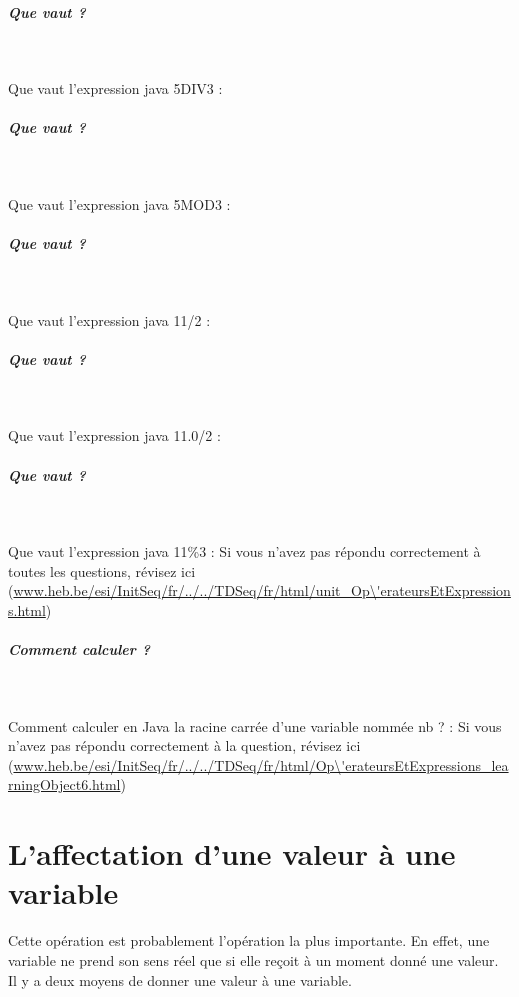 \documentclass[11pt,a4paper]{article}
\begin{document}
			
		\subparagraph{Que vaut ?} 
		
                \textcolor{white}{.} \par
            Que vaut l'expression java
                5DIV3 :  \textcolor{gray}{\underline{\hspace*{1em}}} 
			
		\subparagraph{Que vaut ?} 
		
                \textcolor{white}{.} \par
            Que vaut l'expression java
                5MOD3 :  \textcolor{gray}{\underline{\hspace*{1em}}} 
			
		\subparagraph{Que vaut ?} 
		
                \textcolor{white}{.} \par
            Que vaut l'expression java
                11/2 :  \textcolor{gray}{\underline{\hspace*{1em}}} 
			
		\subparagraph{Que vaut ?} 
		
                \textcolor{white}{.} \par
            Que vaut l'expression java
                11.0/2 :  \textcolor{gray}{\underline{\hspace*{2em}}} 
			
		\subparagraph{Que vaut ?} 
		
                \textcolor{white}{.} \par
            Que vaut l'expression java
                11\%3 :  \textcolor{gray}{\underline{\hspace*{1em}}} Si vous n'avez pas r\'epondu correctement \`a toutes les questions, 
          r\'evisez ici (\url{www.heb.be/esi/InitSeq/fr/../../TDSeq/fr/html/unit\_Op\'erateursEtExpressions.html})
            \par
        
			
		\subparagraph{Comment calculer ?} 
		
                \textcolor{white}{.} \par
            Comment calculer en Java
                la racine carr\'ee d'une variable nomm\'ee nb ? :  \textcolor{gray}{\underline{\hspace*{10em}}} Si vous n'avez pas r\'epondu correctement \`a la question, 
          r\'evisez ici (\url{www.heb.be/esi/InitSeq/fr/../../TDSeq/fr/html/Op\'erateursEtExpressions\_learningObject6.html})
            \par
        \section{L'affectation d'une valeur \`a une variable}
				Cette op\'eration est probablement l'op\'eration la plus importante. En effet, une variable ne
        prend son sens r\'eel que si elle re\c coit \`a un moment donn\'e une valeur. Il y a deux moyens de
        donner une valeur \`a une variable.
      
\end{document}
